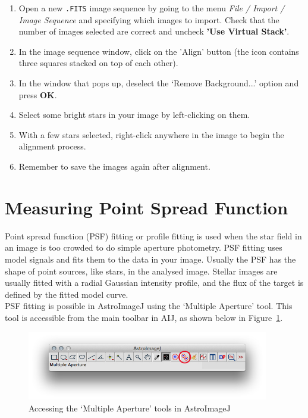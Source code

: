\documentclass[12pt,twoside,a4paper]{report}
\begin{document}
\begin{enumerate}
 \item Open a new {\tt .FITS} image sequence by going to the menu \emph{File / Import / Image Sequence} and specifying which images to import. Check that the number of images selected are correct and uncheck \textbf{'Use Virtual Stack'}.
 \item In the image sequence window, click on the 'Align' button (the icon contains three squares stacked on top of each other).
 \item In the window that pops up, deselect the `Remove Background...' option and press \textbf{OK}.
 \item Select some bright stars in your image by left-clicking on them.
 \item With a few stars selected, right-click anywhere in the image to begin the alignment process.
 \item Remember to save the images again after alignment.
\end{enumerate}


\section{Measuring Point Spread Function}
\label{PSF}

Point spread function (PSF) fitting or profile fitting is used when the star field in an image is too crowded to do simple aperture photometry. PSF fitting uses model signals and fits them to the data in your image. Usually the PSF has the shape of point sources, like stars, in the analysed image. Stellar images are usually fitted with a radial Gaussian intensity profile, and the flux of the target is defined by the fitted model curve.\\

PSF fitting is possible in AstroImageJ using the `Multiple Aperture' tool. This tool is accessible from the main toolbar in AIJ, as shown below in Figure~\ref{fig:AIJ_MA}.

\begin{figure}[ht]
  \centering
    \includegraphics[width=0.94\textwidth]{documentation_images/AIJtoolbarMA.jpg}
    \caption{\label{fig:AIJ_MA}Accessing the `Multiple Aperture' tools in AstroImageJ}
 \end{figure}
\end{document}
